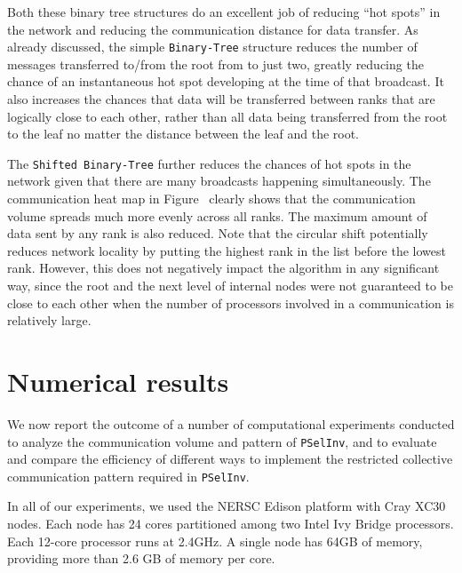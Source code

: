 \documentclass{acm_proc_article-sp}
\newcommand{\pselinv}{\texttt{PSelInv}\xspace}
\newcommand{\btree}{\texttt{Binary-Tree}\xspace}
\newcommand{\modbtree}{\texttt{Shifted Binary-Tree}\xspace}
\begin{document}
Both these binary tree structures do an excellent job of reducing ``hot spots'' in 
the network and reducing the communication distance for data transfer.
As already discussed, the simple \btree structure reduces the number of
messages transferred to/from the root from  to just two, greatly 
reducing the chance of an instantaneous hot spot developing at the 
time of that broadcast.  It also increases the chances that data will 
be transferred between ranks that are logically close to each other, 
rather than all data being transferred from the root to the leaf no 
matter the distance between the leaf and the root.  

The \modbtree further reduces the chances of hot spots in
the network given that there are many broadcasts happening
simultaneously.  The communication heat map in
Figure~ clearly shows that the
communication volume spreads much more evenly across all ranks. 
The maximum amount of data sent by any rank is also reduced. Note that the circular
shift potentially reduces network locality by putting the highest
rank in the list before the lowest rank. However, this
does not negatively impact the algorithm in any
significant way, since the root and the next level of internal nodes
were not guaranteed to be close to each other when the number of
processors involved in a communication is relatively large.





\section{Numerical results}\label{sec:numerical}
We now report the outcome of a number of computational experiments 
conducted to analyze the communication volume and pattern of
\pselinv, and to evaluate and compare the efficiency of different
ways to implement the restricted collective communication pattern
required in \pselinv.

In all of our experiments, we used the NERSC Edison platform with Cray
XC30 nodes. Each node has 24 cores partitioned among two
Intel Ivy Bridge processors.  Each 12-core processor runs at 2.4GHz. A
single node has 64GB of memory, providing more than 2.6 GB of memory per
core.  
\end{document}
